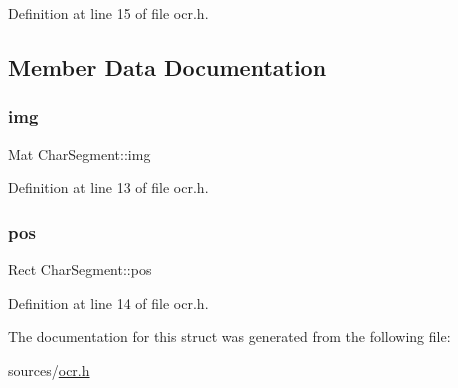 Definition at line 15 of file ocr.\+h.



\subsection{Member Data Documentation}
\mbox{\label{struct_char_segment_a9a25b272291af7bdf3f46d3fe50430bb}} 
\subsubsection{\texorpdfstring{img}{img}}
{\footnotesize\ttfamily Mat Char\+Segment\+::img}



Definition at line 13 of file ocr.\+h.

\mbox{\label{struct_char_segment_a1ed00d0e9995381fd74e646cedff2516}} 
\subsubsection{\texorpdfstring{pos}{pos}}
{\footnotesize\ttfamily Rect Char\+Segment\+::pos}



Definition at line 14 of file ocr.\+h.



The documentation for this struct was generated from the following file\+:\begin{DoxyCompactItemize}
\item 
sources/\mbox{\hyperlink{ocr_8h}{ocr.\+h}}\end{DoxyCompactItemize}
